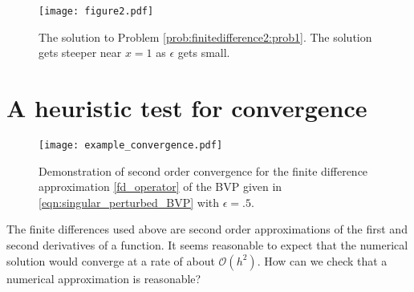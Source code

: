 \begin{figure}[h]
\centering
\texttt{[image: figure2.pdf]}
\caption{The solution to Problem \ref{prob:finitedifference2:prob1}.
The solution gets steeper near $x = 1$ as $\epsilon $ gets small.}
\end{figure}


\begin{comment}
\begin{lstlisting}
import numpy as np
from scipy.sparse import spdiags
from scipy.sparse.linalg import spsolve
import matplotlib.pyplot as plt

def bvp(func, epsilon, alpha, beta, N):
	a,b = 0., 1. 	# Interval for the BVP
	h = (b-a)/N 	# The length of each subinterval

	# Initialize and define the vector F on the right
	F = np.empty(N-1.)
	F[0] = func(a+1.*h)-alpha*(epsilon+h/2.)*h**(-2.)
	F[N-2] = func(a+(N-1)*h)-beta*(epsilon-h/2.)*h**(-2.)
	for j in xrange(1,N-2):
		F[j] = func(a + (j+1)*h)

	# Here we define the arrays that will go on the diagonals of A
	data = np.empty((3,N-1))
	data[0,:] = -2.*epsilon*np.ones((1,N-1)) # main diagonal
	data[1,:]  = (epsilon+h/2.)*np.ones((1,N-1))  	 # off-diagonals
	data[2,:] = (epsilon-h/2.)*np.ones((1,N-1))
	# Next we specify on which diagonals they will be placed, and create A
	diags = np.array([0,-1,1])
	A=h**(-2.)*spdiags(data,diags,N-1,N-1).asformat('csr')

	U = np.empty(N+1)
	U[1:-1] = spsolve(A,F)
	U[0], U[-1] = alpha, beta
	return np.linspace(a,b,N+1), U

x, y = bvp(lambda x:-1., epsilon=.05,alpha=1, beta=3, N=400)
plt.plot(x,y,'-k',linewidth=2.0)
plt.show()

\end{lstlisting}
\end{comment}


\section*{A heuristic test for convergence}
\begin{figure}[ht]
\centering
\texttt{[image: example\_convergence.pdf]}
\caption{Demonstration of second order convergence for the finite difference approximation \eqref{fd_operator} of the BVP given in \eqref{eqn:singular_perturbed_BVP} with $\epsilon = .5$. } \label{fig:finitedifference2}
\end{figure}

The finite differences used above are second order approximations of the first and second derivatives of a function.  It seems reasonable to expect that the numerical solution would converge at a rate of about $\mathcal{O}(h^2)$. How can we check that a numerical approximation is reasonable?

